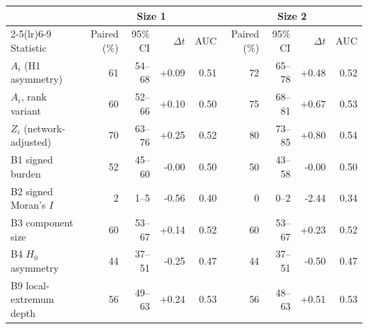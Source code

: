 \begin{tabular}{lrrrrrrrr}
\toprule
 & \multicolumn{4}{c}{Size 1} & \multicolumn{4}{c}{Size 2} \\
\cmidrule(lr){2-5}\cmidrule(lr){6-9}
Statistic & Paired (\%) & 95\% CI & $\Delta t$ & AUC & Paired (\%) & 95\% CI & $\Delta t$ & AUC \\
\midrule
$A_i$ (H1 asymmetry) & 61 & 54--68 & +0.09 & 0.51 & 72 & 65--78 & +0.48 & 0.52 \\
$A_i$, rank variant & 60 & 52--66 & +0.10 & 0.50 & 75 & 68--81 & +0.67 & 0.53 \\
$Z_i$ (network-adjusted) & 70 & 63--76 & +0.25 & 0.52 & 80 & 73--85 & +0.80 & 0.54 \\
B1 signed burden & 52 & 45--60 & -0.00 & 0.50 & 50 & 43--58 & -0.00 & 0.50 \\
B2 signed Moran's $I$ & 2 & 1--5 & -0.56 & 0.40 & 0 & 0--2 & -2.44 & 0.34 \\
B3 component size & 60 & 53--67 & +0.14 & 0.52 & 60 & 53--67 & +0.23 & 0.52 \\
B4 $H_0$ asymmetry & 44 & 37--51 & -0.25 & 0.47 & 44 & 37--51 & -0.50 & 0.47 \\
B9 local-extremum depth & 56 & 49--63 & +0.24 & 0.53 & 56 & 48--63 & +0.51 & 0.53 \\
\bottomrule
\end{tabular}
